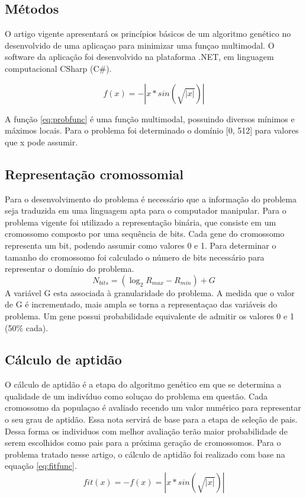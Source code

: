 \documentclass[twoside]{article}
\begin{document}
\begin{multicols}{2}

\section{Métodos}
O artigo vigente apresentará os princípios básicos de um algoritmo genético no desenvolvido de uma aplicaçao para minimizar uma funçao multimodal. O software da aplicação foi desenvolvido na plataforma .NET, em linguagem computacional CSharp (C\#).

\begin{equation}
\label{eq:probfunc}
f(x) = - |x*sin(\sqrt{|x|})|
\end{equation}

A função \ref{eq:probfunc} é uma função multimodal, possuindo diversos mínimos e máximos locais. Para o problema foi determinado o domínio [0, 512] para valores que x pode assumir.

\subsection{Representação cromossomial}
Para o desenvolvimento do problema é necessário que a informação do problema seja traduzida em uma linguagem apta para o computador manipular. Para o problema vigente foi utilizado a representação binária, que consiste em um cromossomo composto por uma sequência de bits. Cada gene do cromossomo representa um bit, podendo assumir como valores 0 e 1. Para determinar o tamanho do cromossomo foi calculado o número de bits necessário para representar o domínio do problema.
\begin{equation}
\label{eq:Funçao do problema}
N_{bits} = ( \log_2 R_{max} - R_{min} ) + G
\end{equation}
A variável G esta associada à granularidade do problema. A medida que o valor de G é incrementado, mais ampla se torna a representaçao das variáveis do problema. Um gene possui probabilidade equivalente de admitir os valores 0 e 1 (50\% cada).

\subsection{Cálculo de aptidão}
O cálculo de aptidão é a etapa do algoritmo genético em que se determina a qualidade de um indivíduo como soluçao do problema em questão. Cada cromossomo da populaçao é avaliado recendo um valor numérico para representar o seu grau de aptidão. Essa nota servirá de base para a etapa de seleção de pais. Dessa forma os individuos com melhor avaliação terão maior probabilidade de serem escolhidos como pais para a próxima geração de cromossomos. Para o problema tratado nesse artigo, o cálculo de aptidão foi realizado com base na equação \ref{eq:fitfunc}.
\begin{equation}
\label{eq:fitfunc}
fit(x) = -f(x) = |x*sin(\sqrt{|x|})|
\end{equation}


\end{multicols}
\end{document}
